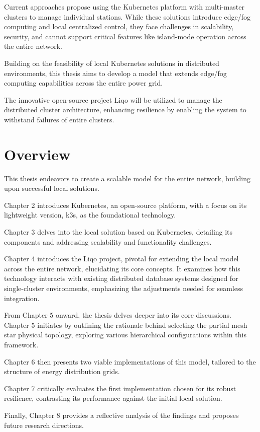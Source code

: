Current approaches propose using the Kubernetes platform with multi-master clusters to manage individual stations. While these solutions introduce edge/fog computing and local centralized control, they face challenges in scalability, security, and cannot support critical features like island-mode operation across the entire network.

Building on the feasibility of local Kubernetes solutions in distributed environments, this thesis aims to develop a model that extends edge/fog computing capabilities across the entire power grid. 

The innovative open-source project Liqo will be utilized to manage the distributed cluster architecture, enhancing resilience by enabling the system to withstand failures of entire clusters.

\section{Overview}
This thesis endeavors to create a scalable model for the entire network, building upon successful local solutions.

Chapter 2 introduces Kubernetes, an open-source platform, with a focus on its lightweight version, k3s, as the foundational technology. 

Chapter 3 delves into the local solution based on Kubernetes, detailing its components and addressing scalability and functionality challenges.

Chapter 4 introduces the Liqo project, pivotal for extending the local model across the entire network, elucidating its core concepts. It examines how this technology interacts with existing distributed database systems designed for single-cluster environments, emphasizing the adjustments needed for seamless integration.

From Chapter 5 onward, the thesis delves deeper into its core discussions. Chapter 5 initiates by outlining the rationale behind selecting the partial mesh star physical topology, exploring various hierarchical configurations within this framework. 

Chapter 6 then presents two viable implementations of this model, tailored to the structure of energy distribution grids.

Chapter 7 critically evaluates the first implementation chosen for its robust resilience, contrasting its performance against the initial local solution. 

Finally, Chapter 8 provides a reflective analysis of the findings and proposes future research directions.








